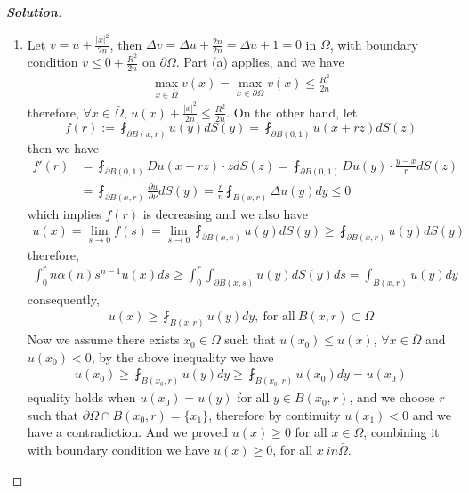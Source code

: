 \documentclass[11pt,reqno]{amsart}
\newcommand{\<}{\langle}
\renewcommand{\>}{\rangle}
\newcommand{\norm}[1]{\vert#1\vert}
\begin{document}
\begin{enumerate}[label={\arabic*.}]
\begin{proof}[\bf{Solution}]
\begin{enumerate}
\item Let $v=u+\frac{\norm{x}^2}{2n}$, then $\Delta v = \Delta u + \frac{2n}{2n} = \Delta u +1 =0 $ in $\Omega$, with boundary condition $v\leq 0+\frac{R^2}{2n}$ on $\partial \Omega$. Part (a) applies, and we have 
\begin{align*}
\max\limits_{x\in\bar{\Omega} }v(x) =\max\limits_{x\in \partial \Omega} v(x) \leq \frac{R^2}{2n}
\end{align*}
therefore, $\forall x \in \bar{\Omega}$, $u(x) + \frac{\norm{x}^2}{2n} \leq \frac{R^2}{2n}$.
On the other hand, let 
$$f(r) := \fint_{\partial B(x,r)} u(y) dS(y) = \fint_{\partial B(0,1)} u(x+rz) dS(z)$$
then we have 
\begin{align*}
f'(r) 
&= 
\fint_{\partial B(0,1)} Du(x+rz) \cdot z dS(z) = \fint_{\partial B(0,1)} Du(y) \cdot \frac{y-x}{r} dS(z) \\
&=
\fint_{\partial B(x,r)} \frac{\partial u}{\partial \nu} dS(y) = \frac{r}{n} \fint_{B(x,r)} \Delta u(y) dy \leq 0
\end{align*}
which implies $f(r)$ is decreasing and we also have
\begin{align*}
u(x) = \lim_{s\rightarrow 0} f(s) = \lim_{s\rightarrow 0} \fint_{\partial B(x,s)} u(y) dS(y) \geq \fint_{\partial B(x,r)} u(y) dS(y)
\end{align*}
therefore, 
\begin{align*}
\int_0^r n\alpha(n)s^{n-1} u(x) ds \geq \int_0^r \int_{\partial B(x,s)} u(y) dS(y)ds = \int_{B(x,r)} u(y) dy
\end{align*}
consequently, 
\begin{align*}
u(x) \geq \fint_{B(x,r)} u(y)dy,\ \text{for\ all} \ B(x,r) \subset \Omega
\end{align*}
Now we assume there exists $x_0 \in \Omega$ such that $u(x_0) \leq u(x)$, $\forall x\in \bar{\Omega}$ and $u(x_0) <0$, by the above inequality we have 
\begin{align*}
u(x_0)\geq \fint_{B(x_0,r)} u(y) dy \geq \fint_{B(x_0,r)} u(x_0) dy = u(x_0)
\end{align*}
equality holds when $u(x_0) = u(y)$ for all $y\in B(x_0, r)$, and we choose $r$ such that $\partial \Omega \cap B(x_0, r) = \{x_1\}$, therefore by continuity $u(x_1) <0$ and we have a contradiction. And we proved $u(x) \geq 0$ for all $x\in \Omega$, combining it with boundary condition we have $u(x) \geq 0$, for all $x\ in \bar{\Omega}$.



\end{enumerate}


\end{proof}
\end{enumerate}
\end{document}
